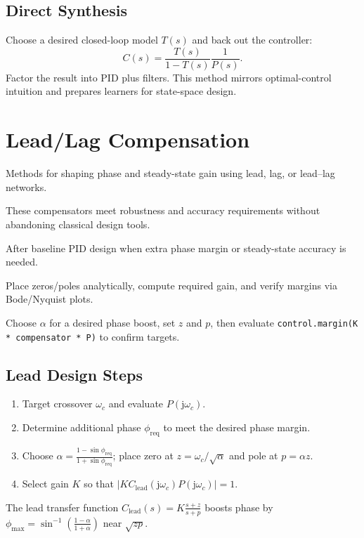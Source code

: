 \subsection{Direct Synthesis}
Choose a desired closed-loop model $T(s)$ and back out the controller:
\[
    C(s) = \frac{T(s)}{1 - T(s)} \frac{1}{P(s)}.
\]
Factor the result into PID plus filters. This method mirrors optimal-control intuition and prepares learners for state-space design.

\section{Lead/Lag Compensation}
\begin{beginnerguide}
    \item[\textbf{What?}] Methods for shaping phase and steady-state gain using lead, lag, or lead--lag networks.
    \item[\textbf{Why?}] These compensators meet robustness and accuracy requirements without abandoning classical design tools.
    \item[\textbf{When?}] After baseline PID design when extra phase margin or steady-state accuracy is needed.
    \item[\textbf{How?}] Place zeros/poles analytically, compute required gain, and verify margins via Bode/Nyquist plots.
    \item[\textbf{Example}] Choose $\alpha$ for a desired phase boost, set $z$ and $p$, then evaluate \texttt{control.margin(K * compensator * P)} to confirm targets.
\end{beginnerguide}
\subsection{Lead Design Steps}
\begin{enumerate}[leftmargin=*]
    \item Target crossover $\omega_c$ and evaluate $P(\mathrm{j}\omega_c)$.
    \item Determine additional phase $\phi_\mathrm{req}$ to meet the desired phase margin.
    \item Choose $\alpha = \frac{1 - \sin\phi_\mathrm{req}}{1 + \sin\phi_\mathrm{req}}$; place zero at $z = \omega_c/\sqrt{\alpha}$ and pole at $p = \alpha z$.
    \item Select gain $K$ so that $|K C_{\text{lead}}(\mathrm{j}\omega_c) P(\mathrm{j}\omega_c)| = 1$.
\end{enumerate}
The lead transfer function $C_{\text{lead}}(s) = K \frac{s + z}{s + p}$ boosts phase by $\phi_{\max} = \sin^{-1}\!\left(\frac{1 - \alpha}{1 + \alpha}\right)$ near $\sqrt{z p}$.

